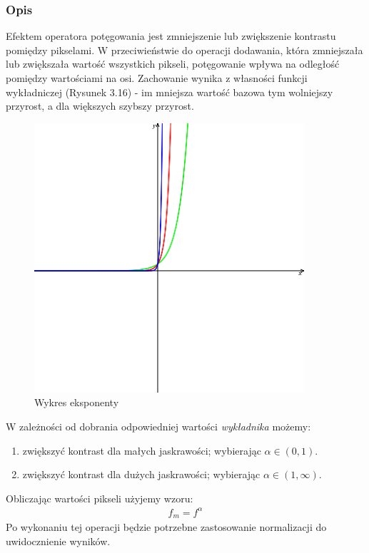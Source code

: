 \documentclass[a4paper,12pt]{book}
\begin{document}
\subsubsection*{Opis}
Efektem operatora potęgowania jest zmniejszenie lub zwiększenie kontrastu pomiędzy pikselami. W przeciwieństwie do operacji dodawania, która zmniejszała lub zwiększała wartość wszystkich pikseli, potęgowanie wpływa na odległość pomiędzy wartościami na osi. Zachowanie wynika z własności funkcji wykładniczej (Rysunek 3.16) - im mniejsza wartość bazowa tym wolniejszy przyrost, a dla większych szybszy przyrost. 
\begin{figure}[H]
	\caption{Wykres eksponenty}
	\includegraphics[width=10cm, height=10cm]{overview/exponential-curve.png}
\end{figure}
W zależności od dobrania odpowiedniej wartości \textit{wykładnika} możemy: 
\begin{enumerate}
	\item zwiększyć kontrast dla małych jaskrawości; wybierając $\alpha \in (0,1)$. 
	\item zwiększyć kontrast dla dużych jaskrawości; wybierając $\alpha \in (1,\infty)$. 
\end{enumerate}
Obliczając wartości pikseli użyjemy wzoru: 
\begin{gather}
	f_m = f^\alpha
\end{gather}
Po wykonaniu tej operacji będzie potrzebne zastosowanie normalizacji do uwidocznienie wyników. 
\end{document}
